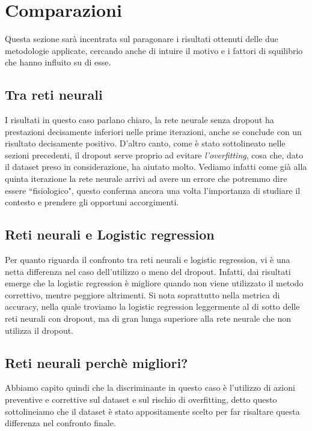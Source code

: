 \section{Comparazioni}
Questa sezione sarà incentrata sul paragonare i risultati ottenuti delle due metodologie applicate, cercando anche di intuire il motivo e i fattori di squilibrio che hanno influito su di esse.
\subsection{Tra reti neurali}
I risultati in questo caso parlano chiaro, la rete neurale senza dropout ha prestazioni decisamente inferiori nelle prime iterazioni, anche se conclude con un risultato decisamente positivo. D'altro canto, come è stato sottolineato nelle sezioni precedenti, il dropout serve proprio ad evitare \textit{l'overfitting}, cosa che, dato il dataset preso in considerazione, ha aiutato molto. Vediamo infatti come già alla quinta iterazione la rete neurale arrivi ad avere un errore che potremmo dire essere ``fisiologico", questo conferma ancora una volta l'importanza di studiare il contesto e prendere gli opportuni accorgimenti.
\subsection{Reti neurali e Logistic regression}
Per quanto riguarda il confronto tra reti neurali e logistic regression, vi è una netta differenza nel caso dell'utilizzo o meno del dropout. Infatti, dai risultati emerge che la logistic regression è migliore quando non viene utilizzato il metodo correttivo, mentre peggiore altrimenti. Si nota soprattutto nella metrica di accuracy, nella quale troviamo la logistic regression leggermente al di sotto delle reti neurali con dropout, ma di gran lunga superiore alla rete neurale che non utilizza il dropout.
\subsection{Reti neurali perchè migliori?}
Abbiamo capito quindi che la discriminante in questo caso è l'utilizzo di azioni preventive e correttive sul dataset e sul rischio di overfitting, detto questo sottolineiamo che il dataset è stato appositamente scelto per far risaltare questa differenza nel confronto finale.

